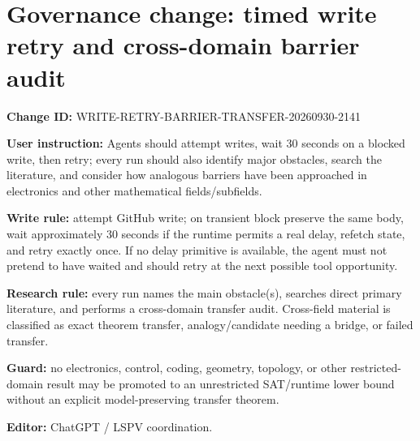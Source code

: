 \documentclass[11pt]{article}
\begin{document}
\section*{Governance change: timed write retry and cross-domain barrier audit}
\textbf{Change ID:} WRITE-RETRY-BARRIER-TRANSFER-20260930-2141

\textbf{User instruction:} Agents should attempt writes, wait 30 seconds on a blocked write, then retry; every run should also identify major obstacles, search the literature, and consider how analogous barriers have been approached in electronics and other mathematical fields/subfields.

\textbf{Write rule:} attempt GitHub write; on transient block preserve the same body, wait approximately 30 seconds if the runtime permits a real delay, refetch state, and retry exactly once. If no delay primitive is available, the agent must not pretend to have waited and should retry at the next possible tool opportunity.

\textbf{Research rule:} every run names the main obstacle(s), searches direct primary literature, and performs a cross-domain transfer audit. Cross-field material is classified as exact theorem transfer, analogy/candidate needing a bridge, or failed transfer.

\textbf{Guard:} no electronics, control, coding, geometry, topology, or other restricted-domain result may be promoted to an unrestricted SAT/runtime lower bound without an explicit model-preserving transfer theorem.

\textbf{Editor:} ChatGPT / LSPV coordination.
\end{document}
